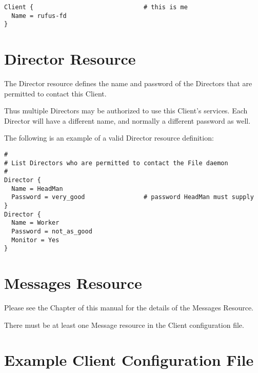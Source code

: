 \footnotesize
\begin{verbatim}
Client {                              # this is me
  Name = rufus-fd
}
\end{verbatim}
\normalsize

\section{Director Resource}
\label{DirectorResource}

The Director resource defines the name and password of the Directors that are
permitted to contact this Client.





Thus multiple Directors may be authorized to use this Client's services. Each
Director will have a different name, and normally a different password as
well.

The following is an example of a valid Director resource definition:

\footnotesize
\begin{verbatim}
#
# List Directors who are permitted to contact the File daemon
#
Director {
  Name = HeadMan
  Password = very_good                # password HeadMan must supply
}
Director {
  Name = Worker
  Password = not_as_good
  Monitor = Yes
}
\end{verbatim}
\normalsize

\section{Messages Resource}
\label{MessagesResource3}

Please see the
 Chapter of this
manual for the details of the Messages Resource.

There must be at least one Message resource in the Client configuration file.

\section{Example Client Configuration File}
\label{SampleClientConfiguration}

